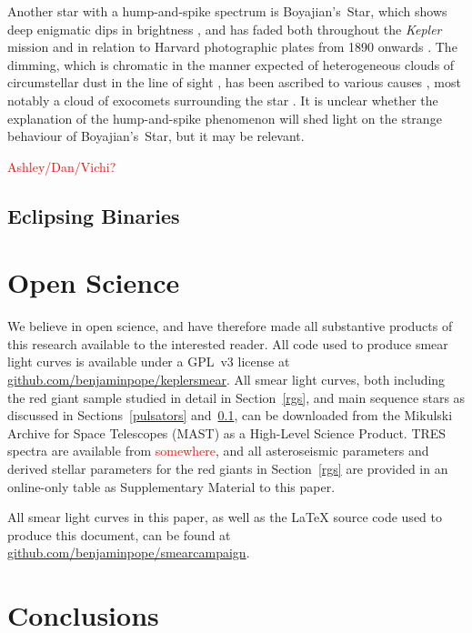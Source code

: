 \documentclass[a4paper,fleqn,usenatbib]{mnras}
\newcommand{\kepler}{\emph{Kepler}\xspace}
\begin{document}
Another star with a hump-and-spike spectrum is Boyajian's~Star, which shows deep enigmatic dips in brightness \citep{2016MNRAS.457.3988B}, and has faded both throughout the \kepler mission \citep{2016ApJ...830L..39M} and in relation to Harvard photographic plates from 1890 onwards \citep{2016ApJ...822L..34S}. The dimming, which is chromatic in the manner expected of heterogeneous clouds of circumstellar dust in the line of sight \citep{2018ApJ...853..130D,2018arXiv180608842B}, has been ascribed to various causes \citep[reviewed in][]{2018RNAAS...2a..16W}, most notably a cloud of exocomets surrounding the star \citep[e.g.][]{2018MNRAS.473.5286W}. It is unclear whether the explanation of the hump-and-spike phenomenon will shed light on the strange behaviour of Boyajian's~Star, but it may be relevant.

\textcolor{red}{Ashley/Dan/Vichi?}

\subsection{Eclipsing Binaries}
\label{ebs}

\section{Open Science}
\label{open}

We believe in open science, and have therefore made all substantive products of this research available to the interested reader. All code used to produce smear light curves is available under a GPL~v3 license at \url{github.com/benjaminpope/keplersmear}. All smear light curves, both including the red giant sample studied in detail in Section~\ref{rgs}, and main sequence stars as discussed in Sections~\ref{pulsators} and~\ref{ebs}, can be downloaded from the Mikulski Archive for Space Telescopes (MAST) as a High-Level Science Product. TRES spectra are available from \textcolor{red}{somewhere}, and all asteroseismic parameters and derived stellar parameters for the red giants in Section~\ref{rgs} are provided in an online-only table as Supplementary Material to this paper.

All smear light curves in this paper, as well as the \LaTeX{} source code used to produce this document, can be found
at \url{github.com/benjaminpope/smearcampaign}.


\section{Conclusions}
\label{conclusions}
\end{document}
